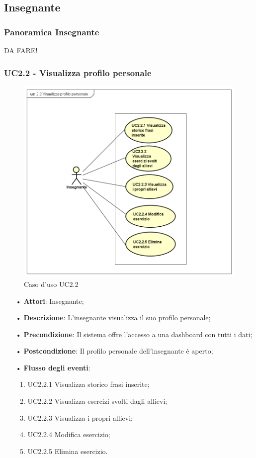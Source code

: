
\subsection{Insegnante}
\subsubsection{Panoramica Insegnante}
DA FARE!

\subsubsection{UC2.2 - Visualizza profilo personale}

\begin{figure}[H]
\centering
\includegraphics[width=17cm]{img/UC22.png} 
\caption{Caso d'uso UC2.2}
\end{figure}

\begin{itemize}
	\item[•] \textbf{Attori}: Insegnante;
	\item[•] \textbf{Descrizione}: L’insegnante visualizza il suo profilo personale;

	\item[•] \textbf{Precondizione}: Il sistema offre l’accesso a una dashboard con tutti i dati;

	\item[•] \textbf{Postcondizione}:  Il profilo personale dell’insegnante è aperto;
	\item[•] \textbf{Flusso degli eventi}:
		\begin{enumerate}
			\item UC2.2.1 Visualizza storico frasi inserite;
			\item UC2.2.2 Visualizza esercizi svolti dagli allievi;
			\item UC2.2.3 Visualizza i propri allievi;
			\item UC2.2.4 Modifica esercizio;
			\item UC2.2.5 Elimina esercizio.
		\end{enumerate}
\end{itemize}

